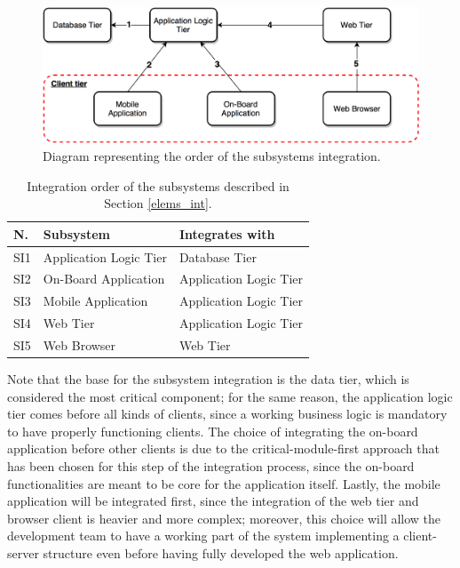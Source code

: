 \begin{figure}[H]
\begin{center}
		\includegraphics[width=\textwidth]{./integration_strategy/diagrams/h_level_subsys.png}
		\caption{Diagram representing the order of the subsystems integration.}
		\label{h_level_subsys}
\end{center}
\end{figure}

\begin{table}[H]
\begin{center}
\begin{tabular}{p{} | p{} | p{}}
\hline
\textbf{N.} & \textbf{Subsystem} & \textbf{Integrates with} \\
\hline
SI1 & Application Logic Tier & Database Tier \\
\hline
SI2 & On-Board Application & Application Logic Tier \\
\hline
SI3 & Mobile Application & Application Logic Tier \\
\hline
SI4 & Web Tier & Application Logic Tier \\
\hline
SI5 & Web Browser & Web Tier \\
\hline
\end{tabular}
\end{center}
\caption{Integration order of the subsystems described in Section \ref{elems_int}.}
\label{subsys_int}
\end{table}

Note that the base for the subsystem integration is the data tier, which is considered the most critical component; for the same reason, the application logic tier comes before all kinds of clients, since a working business logic is mandatory to have properly functioning clients. The choice of integrating the on-board application before other clients is due to the critical-module-first approach that has been chosen for this step of the integration process, since the on-board functionalities are meant to be core for the application itself. Lastly, the mobile application will be integrated first, since the integration of the web tier and browser client is heavier and more complex; moreover, this choice will allow the development team to have a working part of the system implementing a client-server structure even before having fully developed the web application.
